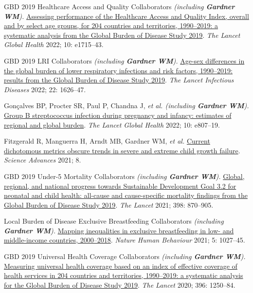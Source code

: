 \documentclass[11pt,article,oneside]{memoir}
\begin{document}
\ind GBD 2019 Healthcare Access and Quality Collaborators \emph{(including \textbf{Gardner WM}).} \href{https://doi.org/10.1016/S2214-109X(22)00429-6}{Assessing performance of
the Healthcare Access and Quality Index, overall and by select age groups, for 204 countries and territories,
1990--2019: a systematic analysis from the Global Burden of Disease Study 2019}. \emph{The Lancet Global Health} 2022; 10: e1715--43.

\ind GBD 2019 LRI Collaborators \emph{(including \textbf{Gardner WM}).} \href{https://doi.org/10.1016/S1473-3099(22)00510-2}{Age-sex differences in the global burden of lower
respiratory infections and risk factors, 1990--2019: results from the Global Burden of Disease Study 2019}. \emph{The Lancet Infectious Diseases} 2022; 22: 1626--47.

\ind Gonçalves BP, Procter SR, Paul P, Chandna J, \emph{et al. (including \textbf{Gardner WM}).} \href{https://doi.org/10.1016/S2214-109X(22)00093-6}{Group B streptococcus infection during pregnancy 
and infancy: estimates of regional and global burden}. \emph{The Lancet Global Health} 2022; 10: e807--19.

\ind Fitzgerald R, Manguerra H, Arndt MB, {\minbold Gardner WM}, \emph{et al.} \href{https://doi.org/10.1126/sciadv.abm8954}{Current dichotomous metrics obscure trends in
severe and extreme child growth failure}. \emph{Science Advances} 2021; 8.

\ind GBD 2019 Under-5 Mortality Collaborators \emph{(including \textbf{Gardner WM}).} \href{https://doi.org/10.1016/S0140-6736(21)01207-1}{Global, regional, and national progress
towards Sustainable Development Goal 3.2 for neonatal and child health: all-cause and cause-specific
mortality findings from the Global Burden of Disease Study 2019}. \emph{The Lancet} 2021; 398: 870--905.

\ind Local Burden of Disease Exclusive Breastfeeding Collaborators \emph{(including \textbf{Gardner WM}).} \href{https://doi.org/10.1038/s41562-021-01108-6}{Mapping inequalities
in exclusive breastfeeding in low- and middle-income countries, 2000--2018}. \emph{Nature Human Behaviour} 2021; 5: 1027--45.

\ind GBD 2019 Universal Health Coverage Collaborators \emph{(including \textbf{Gardner WM}).} \href{https://doi.org/10.1016/S0140-6736(20)30750-9}{Measuring universal health
coverage based on an index of effective coverage of health services in 204 countries and territories, 1990--2019: a 
systematic analysis for the Global Burden of Disease Study 2019}. \emph{The Lancet} 2020; 396: 1250--84.
\end{document}
